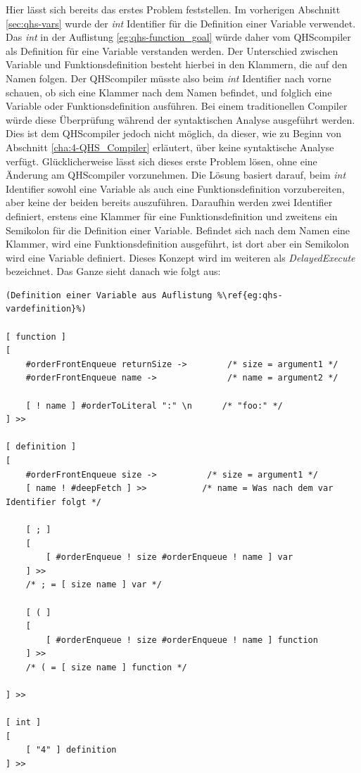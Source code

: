 Hier lässt sich bereits das erstes Problem feststellen. Im vorherigen Abschnitt \ref{sec:qhs-vars} wurde der \textit{int} Identifier für die Definition einer Variable verwendet. 
Das \textit{int} in der Auflistung \ref{eg:qhs-function_goal} würde daher vom QHScompiler als Definition für eine Variable verstanden werden. Der Unterschied zwischen Variable und Funktionsdefinition besteht hierbei in den Klammern,
die auf den Namen folgen. Der QHScompiler müsste also beim \textit{int} Identifier nach vorne schauen, ob sich eine Klammer nach dem Namen befindet, und folglich eine Variable oder Funktionsdefinition ausführen.
Bei einem traditionellen Compiler würde diese Überprüfung während der syntaktischen Analyse ausgeführt werden.
Dies ist dem QHScompiler jedoch nicht möglich, da dieser, wie zu Beginn von Abschnitt \ref{cha:4-QHS_Compiler} erläutert, über keine syntaktische Analyse verfügt.
Glücklicherweise lässt sich dieses erste Problem lösen, ohne eine Änderung am QHScompiler vorzunehmen.
Die Lösung basiert darauf, beim \textit{int} Identifier sowohl eine Variable als auch eine Funktionsdefinition vorzubereiten, aber keine der beiden bereits auszuführen.
Daraufhin werden zwei Identifier definiert, erstens eine Klammer für eine Funktionsdefinition und zweitens ein Semikolon für die Definition einer Variable.
Befindet sich nach dem Namen eine Klammer, wird eine Funktionsdefinition ausgeführt, ist dort aber ein Semikolon wird eine Variable definiert.
Dieses Konzept wird im weiteren als \textit{DelayedExecute} bezeichnet. Das Ganze sieht danach wie folgt aus:

\begin{minipage}{\linewidth}
\begin{lstlisting}[language=QHS, caption=Implementation eines DelayedExecute für Definitionen]
(Definition einer Variable aus Auflistung %\ref{eg:qhs-vardefinition}%)

[ function ]
[
    #orderFrontEnqueue returnSize ->        /* size = argument1 */
    #orderFrontEnqueue name ->              /* name = argument2 */

    [ ! name ] #orderToLiteral ":" \n      /* "foo:" */
] >>

[ definition ]
[
    #orderFrontEnqueue size ->          /* size = argument1 */
    [ name ! #deepFetch ] >>           /* name = Was nach dem var Identifier folgt */

    [ ; ]
    [
        [ #orderEnqueue ! size #orderEnqueue ! name ] var 
    ] >>
    /* ; = [ size name ] var */

    [ ( ]
    [
        [ #orderEnqueue ! size #orderEnqueue ! name ] function 
    ] >>
    /* ( = [ size name ] function */

] >>

[ int ]
[
    [ "4" ] definition
] >>
\end{lstlisting}
\end{minipage}


